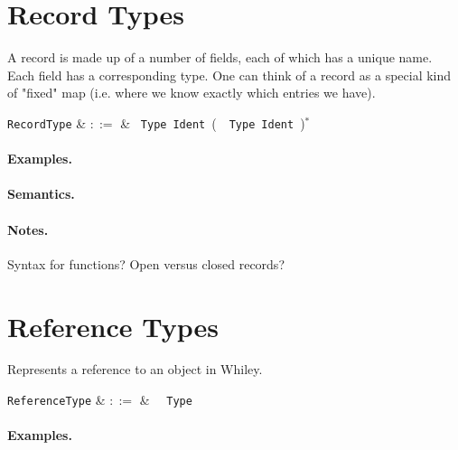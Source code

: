 
\section{Record Types}

A record is made up of a number of fields, each of which has a unique name. Each field has a corresponding type. One can think of a record as a special kind of "fixed" map (i.e. where we know exactly which entries we have).

\begin{syntax}
  \verb+RecordType+ & $::=$ & \token{\{}\ \verb+Type+\
  \verb+Ident+\ \big(\ \token{,}\ \verb+Type+\ \verb+Ident+\
  \big)$^*$ \ \token{\}}\\
\end{syntax}

\paragraph{Examples.}

\paragraph{Semantics.}

\paragraph{Notes.}  Syntax for functions?  Open versus closed records?


\section{Reference Types}

Represents a reference to an object in Whiley.

\begin{syntax}
  \verb+ReferenceType+ & $::=$ & \token{\&}\ \ \verb+Type+\\
\end{syntax}

\paragraph{Examples.}

